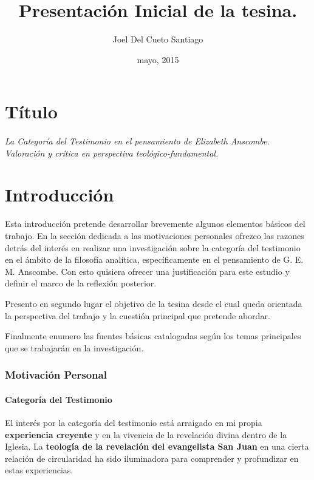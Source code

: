 \documentclass[12pt]{article}
\title{Presentación Inicial de la tesina.}
\author{Joel Del Cueto Santiago}
\date{mayo, 2015}
\begin{document}
\reversemarginpar

\maketitle

\part*{Título}
\paragraph{\noindent La Categoría del Testimonio en el pensamiento de Elizabeth Anscombe.\\
\emph{Valoración y crítica en perspectiva teológico-fundamental.}}

\part*{Introducción}

Esta introducción pretende desarrollar brevemente algunos elementos básicos del trabajo. En la sección dedicada a las motivaciones personales ofrezco las razones detrás del interés en realizar una investigación sobre la categoría del testimonio en el ámbito de la filosofía analítica, específicamente en el pensamiento de G. E. M. Anscombe. Con esto quisiera ofrecer una justificación para este estudio y definir el marco de la reflexión posterior.

Presento en segundo lugar el objetivo de la tesina desde el cual queda orientada la perspectiva del trabajo y la cuestión principal que pretende abordar.

Finalmente enumero las fuentes básicas catalogadas según los temas principales que se trabajarán en la investigación.

\section{Motivación Personal}

\subsection{Categoría del Testimonio}

El interés por la categoría del testimonio está arraigado en mi propia \textbf{experiencia creyente} y en la vivencia de la revelación divina dentro de la Iglesia. La \textbf{teología de la revelación del evangelista San Juan} en una cierta relación de circularidad ha sido iluminadora para comprender y profundizar en estas experiencias.
\end{document}
